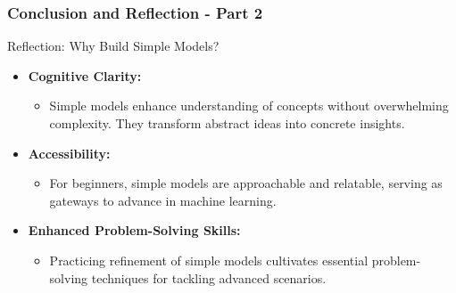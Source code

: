\documentclass[aspectratio=169]{beamer}
\begin{document}
\begin{frame}[fragile]
    \frametitle{Conclusion and Reflection - Part 2}
    \begin{block}{Reflection: Why Build Simple Models?}
        \begin{itemize}
            \item \textbf{Cognitive Clarity:} 
                \begin{itemize}
                    \item Simple models enhance understanding of concepts without overwhelming complexity. They transform abstract ideas into concrete insights.
                \end{itemize}
                
            \item \textbf{Accessibility:} 
                \begin{itemize}
                    \item For beginners, simple models are approachable and relatable, serving as gateways to advance in machine learning.
                \end{itemize}
                
            \item \textbf{Enhanced Problem-Solving Skills:}
                \begin{itemize}
                    \item Practicing refinement of simple models cultivates essential problem-solving techniques for tackling advanced scenarios.
                \end{itemize}
        \end{itemize}
    \end{block}
\end{frame}
\end{document}
